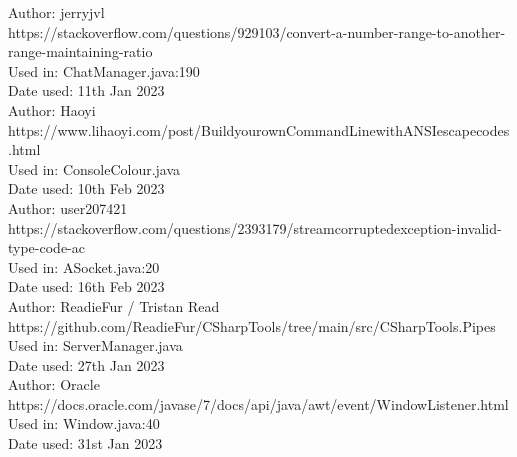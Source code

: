 \documentclass{COMPXXXX}
\begin{document}
\normalsize \textrm {Author: jerryjvl\\
https://stackoverflow.com/questions/929103/convert-a-number-range-to-another-range-maintaining-ratio\\
Used in: ChatManager.java:190\\
Date used: 11th Jan 2023\\
Author: Haoyi\\
https://www.lihaoyi.com/post/BuildyourownCommandLinewithANSIescapecodes.html\\
Used in: ConsoleColour.java\\
Date used: 10th Feb 2023\\
Author: user207421\\
https://stackoverflow.com/questions/2393179/streamcorruptedexception-invalid-type-code-ac\\
Used in: ASocket.java:20\\
Date used: 16th Feb 2023\\
Author: ReadieFur / Tristan Read\\
https://github.com/ReadieFur/CSharpTools/tree/main/src/CSharpTools.Pipes\\
Used in: ServerManager.java\\
Date used: 27th Jan 2023\\
Author: Oracle\\
https://docs.oracle.com/javase/7/docs/api/java/awt/event/WindowListener.html\\
Used in: Window.java:40\\
Date used: 31st Jan 2023}
\end{document}
